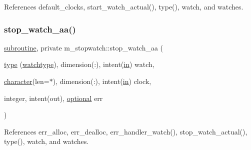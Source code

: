 References default\+\_\+clocks, start\+\_\+watch\+\_\+actual(), type(), watch, and watches.

\mbox{\label{namespacem__stopwatch_afa380a4a41a9059977ffef300380d8f2}} 
\subsubsection{\texorpdfstring{stop\+\_\+watch\+\_\+aa()}{stop\_watch\_aa()}}
{\footnotesize\ttfamily \hyperlink{M__stopwatch_83_8txt_acfbcff50169d691ff02d4a123ed70482}{subroutine}, private m\+\_\+stopwatch\+::stop\+\_\+watch\+\_\+aa (\begin{DoxyParamCaption}\item[{\hyperlink{stop__watch_83_8txt_a70f0ead91c32e25323c03265aa302c1c}{type} (\hyperlink{structm__stopwatch_1_1watchtype}{watchtype}), dimension(\+:), intent(\hyperlink{M__journal_83_8txt_afce72651d1eed785a2132bee863b2f38}{in})}]{watch,  }\item[{\hyperlink{option__stopwatch_83_8txt_abd4b21fbbd175834027b5224bfe97e66}{character}(len=$\ast$), dimension(\+:), intent(\hyperlink{M__journal_83_8txt_afce72651d1eed785a2132bee863b2f38}{in})}]{clock,  }\item[{integer, intent(out), \hyperlink{option__stopwatch_83_8txt_aa4ece75e7acf58a4843f70fe18c3ade5}{optional}}]{err }\end{DoxyParamCaption})\hspace{0.3cm}{\ttfamily [private]}}



References err\+\_\+alloc, err\+\_\+dealloc, err\+\_\+handler\+\_\+watch(), stop\+\_\+watch\+\_\+actual(), type(), watch, and watches.

\mbox{\label{namespacem__stopwatch_a24cd395f8edd9999704a1ba6444267e8}} 
